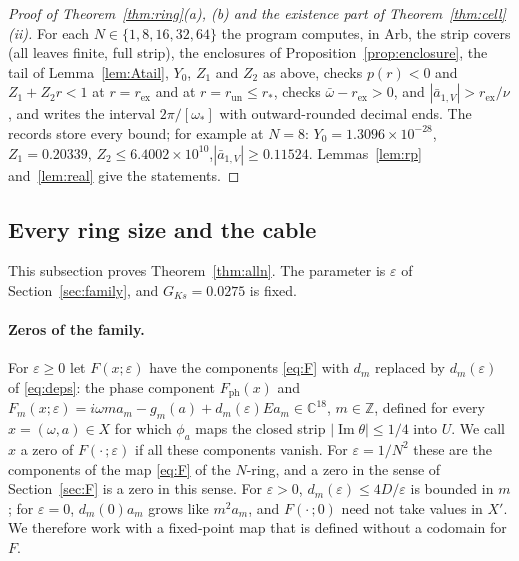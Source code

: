 \documentclass[11pt]{article}
\theoremstyle{definition}
\newcommand{\C}{\mathbb{C}}
\newcommand{\Z}{\mathbb{Z}}
\newcommand{\im}{\operatorname{Im}}
\begin{document}
\begin{proof}[Proof of Theorem~\ref{thm:ring}(a), (b) and the existence part of Theorem~\ref{thm:cell}(ii)]
For each $N \in \{1, 8, 16, 32, 64\}$ the program  computes, in Arb, the strip covers (all leaves finite, full strip), the enclosures of Proposition~\ref{prop:enclosure}, the tail of Lemma~\ref{lem:Atail}, $Y_0$, $Z_1$ and $Z_2$ as above, checks $p(r) < 0$ and $Z_1 + Z_2r < 1$ at $r = r_{\mathrm{ex}}$ and at $r = r_{\mathrm{un}} \le r_*$, checks $\bar\omega - r_{\mathrm{ex}} > 0$, and $|\bar a_{1,V}| > r_{\mathrm{ex}}/\nu$, and writes the interval $2\pi/[\omega_*]$ with outward-rounded decimal ends. The records  store every bound; for example at $N = 8$: $Y_0 = 1.3096 \times 10^{-28}$, $Z_1 = 0.20339$, $Z_2 \le 6.4002 \times 10^{10}$,\allowbreak $|\bar a_{1,V}| \ge 0.11524$. Lemmas~\ref{lem:rp} and~\ref{lem:real} give the statements.
\end{proof}

\subsection{Every ring size and the cable}\label{sec:alln}

This subsection proves Theorem~\ref{thm:alln}. The parameter is $\varepsilon$ of Section~\ref{sec:family}, and $G_{Ks} = 0.0275$ is fixed.

\paragraph{Zeros of the family.} For $\varepsilon \ge 0$ let $F(x;\varepsilon)$ have the components \eqref{eq:F} with $d_m$ replaced by $d_m(\varepsilon)$ of \eqref{eq:deps}: the phase component $F_{\mathrm{ph}}(x)$ and $F_m(x;\varepsilon) = i\omega ma_m - g_m(a) + d_m(\varepsilon)Ea_m \in \C^{18}$, $m \in \Z$, defined for every $x = (\omega, a) \in X$ for which $\phi_a$ maps the closed strip $|\im\theta| \le 1/4$ into $U$. We call $x$ a zero of $F(\cdot\,;\varepsilon)$ if all these components vanish. For $\varepsilon = 1/N^2$ these are the components of the map \eqref{eq:F} of the $N$-ring, and a zero in the sense of Section~\ref{sec:F} is a zero in this sense. For $\varepsilon > 0$, $d_m(\varepsilon) \le 4D/\varepsilon$ is bounded in $m$; for $\varepsilon = 0$, $d_m(0)a_m$ grows like $m^2a_m$, and $F(\cdot\,;0)$ need not take values in $X'$. We therefore work with a fixed-point map that is defined without a codomain for $F$.
\end{document}
